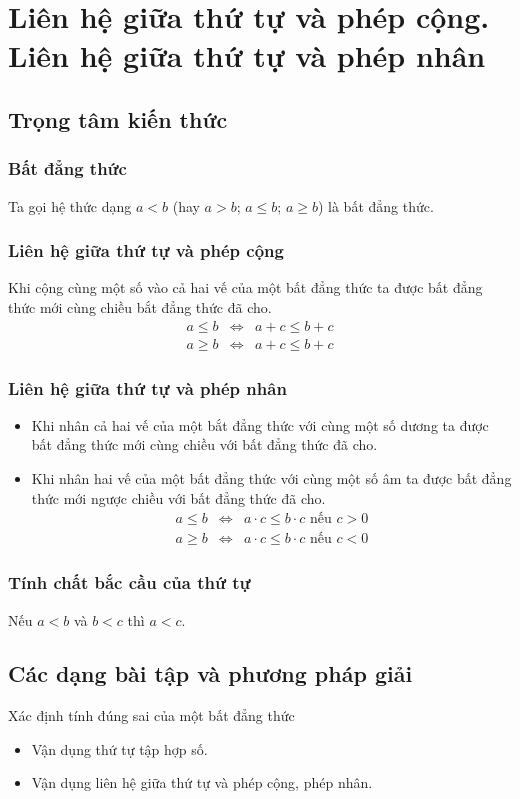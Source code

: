 \section{Liên hệ giữa thứ tự và phép cộng. Liên hệ giữa thứ tự và phép nhân}
\subsection{Trọng tâm kiến thức}
\subsubsection{Bất đẳng thức}
Ta gọi hệ thức dạng $a<b$ (hay $a>b$; $a\leq b$; $a\geq b$) là bất đẳng thức.
\subsubsection{Liên hệ giữa thứ tự và phép cộng}
Khi cộng cùng một  số vào cả hai vế của một bất đẳng thức ta được bất đẳng thức mới cùng chiều bắt đẳng thức đã cho.
\begin{eqnarray*}
a\leq b &\Leftrightarrow& a+c\leq b+c\\
a\geq b &\Leftrightarrow& a+c\leq b+c
\end{eqnarray*}
\subsubsection{Liên hệ giữa thứ tự và phép nhân}
\begin{itemize}
	\item Khi nhân cả hai vế của một bắt đẳng thức với cùng một số dương ta được bất đẳng thức mới cùng chiều với bất đẳng thức đã cho.
	\item Khi nhân hai vế của một bất đẳng thức với cùng một số âm ta được bất đẳng thức mới ngược chiều với bất đẳng thức đã cho.
	\begin{eqnarray*}
		a\leq b &\Leftrightarrow& a\cdot c\leq b\cdot c \text{ nếu } c>0\\
		a\geq b &\Leftrightarrow& a\cdot c\leq b\cdot c \text{ nếu } c<0
	\end{eqnarray*}
\end{itemize}
\subsubsection{Tính chất bắc cầu của thứ tự}
Nếu $a<b$ và $b<c$ thì $a<c$.
\subsection{Các dạng bài tập và phương pháp giải}
\begin{dang}{Xác định tính đúng sai của một bất đẳng thức}
	\begin{itemize}
		\item Vận dụng thứ tự tập hợp số.
		\item Vận dụng liên hệ giữa thứ tự và phép cộng, phép nhân.
	\end{itemize}
\end{dang}

